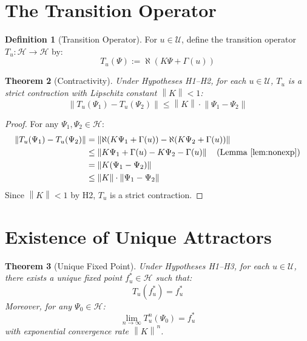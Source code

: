 \documentclass[11pt,a4paper]{article}
\theoremstyle{plain}
\newtheorem{theorem}{Theorem}[section]
\theoremstyle{definition}
\newtheorem{definition}[theorem]{Definition}
\newcommand{\Hilb}{\mathcal{H}}
\newcommand{\U}{\mathcal{U}}
\newcommand{\norm}[1]{\left\lVert #1 \right\rVert}
\begin{document}
\section{The Transition Operator}

\begin{definition}[Transition Operator]\label{def:transition}
For $u \in \U$, define the transition operator $T_u: \Hilb \to \Hilb$ by:
\[
T_u(\Psi) := \aleph(K\Psi + \Gamma(u))
\]
\end{definition}

\begin{theorem}[Contractivity]\label{thm:contraction}
Under Hypotheses H1--H2, for each $u \in \U$, $T_u$ is a strict contraction with Lipschitz constant $\norm{K} < 1$:
\[
\norm{T_u(\Psi_1) - T_u(\Psi_2)} \leq \norm{K} \cdot \norm{\Psi_1 - \Psi_2}
\]
\end{theorem}

\begin{proof}
For any $\Psi_1, \Psi_2 \in \Hilb$:
\begin{align*}
\norm{T_u(\Psi_1) - T_u(\Psi_2)} &= \norm{\aleph(K\Psi_1 + \Gamma(u)) - \aleph(K\Psi_2 + \Gamma(u))} \\
&\leq \norm{K\Psi_1 + \Gamma(u) - K\Psi_2 - \Gamma(u)} \quad \text{(Lemma \ref{lem:nonexp})} \\
&= \norm{K(\Psi_1 - \Psi_2)} \\
&\leq \norm{K} \cdot \norm{\Psi_1 - \Psi_2}
\end{align*}
Since $\norm{K} < 1$ by H2, $T_u$ is a strict contraction.
\end{proof}

\section{Existence of Unique Attractors}

\begin{theorem}[Unique Fixed Point]\label{thm:fixedpoint}
Under Hypotheses H1--H3, for each $u \in \U$, there exists a unique fixed point $f^*_u \in \Hilb$ such that:
\[
T_u(f^*_u) = f^*_u
\]
Moreover, for any $\Psi_0 \in \Hilb$:
\[
\lim_{n \to \infty} T_u^n(\Psi_0) = f^*_u
\]
with exponential convergence rate $\norm{K}^n$.
\end{theorem}
\end{document}
